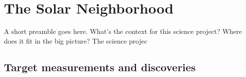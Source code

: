 %
%
%
%
%
%
%
%

\section{The Solar Neighborhood}
\def\secname{keyword}\label{sec:\secname} %



A short preamble goes here. What's the context for this science
project? Where does it fit in the big picture?
The science projec


\subsection{Target measurements and discoveries}
\label{sec:keyword:targets}

